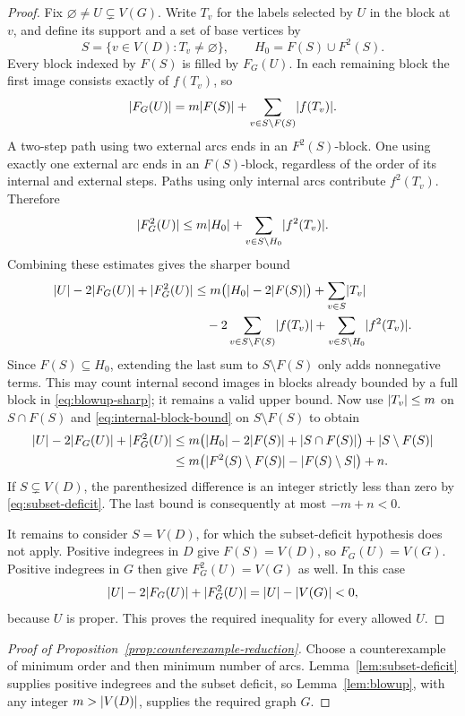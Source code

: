 \begin{proof}
Fix $\varnothing\ne U\subsetneq V(G)$.  Write $T_v$ for the labels
selected by $U$ in the block at $v$, and define its support and a set
of base vertices by
\[
  S=\{v\in V(D):T_v\ne\varnothing\},\qquad
  H_0=F(S)\cup F^2(S).
\]
Every block indexed by $F(S)$ is filled by $F_G(U)$.  In each remaining
block the first image consists exactly of $f(T_v)$, so
\[
  \lvert F_G(U)\rvert=m\lvert F(S)\rvert
     +\sum_{v\in S\setminus F(S)}\lvert f(T_v)\rvert.
\]
A two-step path using two external arcs ends in an $F^2(S)$-block.
One using exactly one external arc ends in an $F(S)$-block, regardless
of the order of its internal and external steps.  Paths using only
internal arcs contribute $f^2(T_v)$.  Therefore
\[
  \lvert F_G^2(U)\rvert\le m\lvert H_0\rvert
     +\sum_{v\in S\setminus H_0}\lvert f^2(T_v)\rvert.
\]
Combining these estimates gives the sharper bound
\begin{align}
\label{eq:blowup-sharp}
  \lvert U\rvert-2\lvert F_G(U)\rvert+\lvert F_G^2(U)\rvert
  &\le m\bigl(\lvert H_0\rvert-2\lvert F(S)\rvert\bigr)
       +\sum_{v\in S}\lvert T_v\rvert \notag\\
  &\quad -2\sum_{v\in S\setminus F(S)}\lvert f(T_v)\rvert
       +\sum_{v\in S\setminus H_0}\lvert f^2(T_v)\rvert.
\end{align}
Since $F(S)\subseteq H_0$, extending the last sum to
$S\setminus F(S)$ only adds nonnegative terms.  This may count internal
second images in blocks already bounded by a full block in
\eqref{eq:blowup-sharp}; it remains a valid upper bound.  Now use
$\lvert T_v\rvert\le m$ on $S\cap F(S)$ and
\eqref{eq:internal-block-bound} on $S\setminus F(S)$ to obtain
\begin{align*}
  \lvert U\rvert-2\lvert F_G(U)\rvert+\lvert F_G^2(U)\rvert
  &\le m\bigl(\lvert H_0\rvert-2\lvert F(S)\rvert
                    +\lvert S\cap F(S)\rvert\bigr)
       +\lvert S\setminus F(S)\rvert\\
  &\le m\bigl(\lvert F^2(S)\setminus F(S)\rvert
                    -\lvert F(S)\setminus S\rvert\bigr)+n.
\end{align*}
If $S\subsetneq V(D)$, the parenthesized difference is an integer
strictly less than zero by \eqref{eq:subset-deficit}.  The last bound
is consequently at most $-m+n<0$.

It remains to consider $S=V(D)$, for which the subset-deficit hypothesis
does not apply.  Positive indegrees in $D$ give $F(S)=V(D)$, so
$F_G(U)=V(G)$.  Positive indegrees in $G$ then give
$F_G^2(U)=V(G)$ as well.  In this case
\[
  \lvert U\rvert-2\lvert F_G(U)\rvert+\lvert F_G^2(U)\rvert
  =\lvert U\rvert-\lvert V(G)\rvert<0,
\]
because $U$ is proper.  This proves the required inequality for every
allowed $U$.
\end{proof}

\begin{proof}[Proof of Proposition~\ref{prop:counterexample-reduction}]
Choose a counterexample of minimum order and then minimum number of
arcs.  Lemma~\ref{lem:subset-deficit} supplies positive indegrees and
the subset deficit, so Lemma~\ref{lem:blowup}, with any integer
$m>\lvert V(D)\rvert$, supplies the required graph $G$.
\end{proof}
